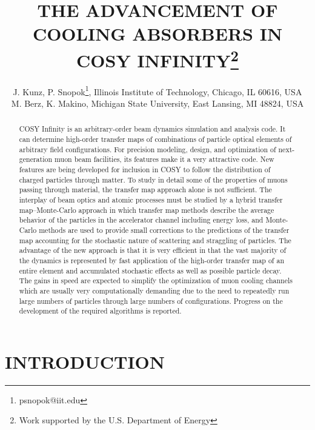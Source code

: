 \documentclass{jacow}
\begin{document}
\title{THE ADVANCEMENT OF COOLING ABSORBERS IN COSY INFINITY\thanks{Work supported by the U.S. Department of Energy}}

\author{J. Kunz, P. Snopok\thanks{psnopok@iit.edu}, Illinois Institute of Technology, Chicago, IL 60616, USA \\
M. Berz, K. Makino, Michigan State University, East Lansing, MI 48824, USA}

\maketitle

\begin{abstract}
COSY Infinity is an arbitrary-order beam dynamics simulation and analysis code. It can determine high-order transfer maps of combinations of particle optical elements of arbitrary field configurations. For precision modeling, design, and optimization of next-generation muon beam facilities, its features make it a very attractive code. New features are being developed for inclusion in COSY to follow the distribution of charged particles through matter. To study in detail some of the properties of muons passing through material, the transfer map approach alone is not sufficient. The interplay of beam optics and atomic processes must be studied by a hybrid transfer map--Monte-Carlo approach in which transfer map methods describe the average behavior of the particles in the accelerator channel including energy loss, and Monte-Carlo methods are used to provide small corrections to the predictions of the transfer map accounting for the stochastic nature of scattering and straggling of particles. The advantage of the new approach is that it is very efficient in that the vast majority of the dynamics is represented by fast application of the high-order transfer map of an entire element and accumulated stochastic effects as well as possible particle decay. The gains in speed are expected to simplify the optimization of muon cooling channels which are usually very computationally demanding due to the need to repeatedly run large numbers of particles through large numbers of configurations. Progress on the development of the required algorithms is reported.
\end{abstract}

\section{INTRODUCTION}
\end{document}
